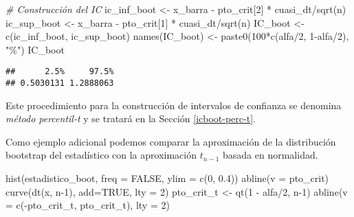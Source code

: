 \documentclass[
]{book}
\newenvironment{Shaded}{\begin{snugshade}}{\end{snugshade}}
\newcommand{\AttributeTok}[1]{\textcolor[rgb]{0.77,0.63,0.00}{#1}}
\newcommand{\CommentTok}[1]{\textcolor[rgb]{0.56,0.35,0.01}{\textit{#1}}}
\newcommand{\ConstantTok}[1]{\textcolor[rgb]{0.00,0.00,0.00}{#1}}
\newcommand{\DecValTok}[1]{\textcolor[rgb]{0.00,0.00,0.81}{#1}}
\newcommand{\FloatTok}[1]{\textcolor[rgb]{0.00,0.00,0.81}{#1}}
\newcommand{\FunctionTok}[1]{\textcolor[rgb]{0.00,0.00,0.00}{#1}}
\newcommand{\NormalTok}[1]{#1}
\newcommand{\OtherTok}[1]{\textcolor[rgb]{0.56,0.35,0.01}{#1}}
\newcommand{\SpecialCharTok}[1]{\textcolor[rgb]{0.00,0.00,0.00}{#1}}
\newcommand{\StringTok}[1]{\textcolor[rgb]{0.31,0.60,0.02}{#1}}
\theoremstyle{break}
\theoremstyle{definition}
\theoremstyle{definition}
\theoremstyle{definition}
\theoremstyle{definition}
\theoremstyle{remark}
\begin{document}
\begin{Shaded}
\begin{Highlighting}[]
\CommentTok{\# Construcción del IC}
\NormalTok{ic\_inf\_boot }\OtherTok{\textless{}{-}}\NormalTok{ x\_barra }\SpecialCharTok{{-}}\NormalTok{ pto\_crit[}\DecValTok{2}\NormalTok{] }\SpecialCharTok{*}\NormalTok{ cuasi\_dt}\SpecialCharTok{/}\FunctionTok{sqrt}\NormalTok{(n)}
\NormalTok{ic\_sup\_boot }\OtherTok{\textless{}{-}}\NormalTok{ x\_barra }\SpecialCharTok{{-}}\NormalTok{ pto\_crit[}\DecValTok{1}\NormalTok{] }\SpecialCharTok{*}\NormalTok{ cuasi\_dt}\SpecialCharTok{/}\FunctionTok{sqrt}\NormalTok{(n)}
\NormalTok{IC\_boot }\OtherTok{\textless{}{-}} \FunctionTok{c}\NormalTok{(ic\_inf\_boot, ic\_sup\_boot)}
\FunctionTok{names}\NormalTok{(IC\_boot) }\OtherTok{\textless{}{-}} \FunctionTok{paste0}\NormalTok{(}\DecValTok{100}\SpecialCharTok{*}\FunctionTok{c}\NormalTok{(alfa}\SpecialCharTok{/}\DecValTok{2}\NormalTok{, }\DecValTok{1}\SpecialCharTok{{-}}\NormalTok{alfa}\SpecialCharTok{/}\DecValTok{2}\NormalTok{), }\StringTok{"\%"}\NormalTok{)}
\NormalTok{IC\_boot}
\end{Highlighting}
\end{Shaded}

\begin{verbatim}
##      2.5%     97.5% 
## 0.5030131 1.2888063
\end{verbatim}

Este procedimiento para la construcción de intervalos de confianza
se denomina \emph{método percentil-t} y se tratará en la Sección \ref{icboot-perc-t}.

Como ejemplo adicional podemos comparar la aproximación de la distribución bootstrap del estadístico con la aproximación \(t_{n-1}\) basada en normalidad.

\begin{Shaded}
\begin{Highlighting}[]
\FunctionTok{hist}\NormalTok{(estadistico\_boot, }\AttributeTok{freq =} \ConstantTok{FALSE}\NormalTok{, }\AttributeTok{ylim =} \FunctionTok{c}\NormalTok{(}\DecValTok{0}\NormalTok{, }\FloatTok{0.4}\NormalTok{))}
\FunctionTok{abline}\NormalTok{(}\AttributeTok{v =}\NormalTok{ pto\_crit)}
\FunctionTok{curve}\NormalTok{(}\FunctionTok{dt}\NormalTok{(x, n}\DecValTok{{-}1}\NormalTok{), }\AttributeTok{add=}\ConstantTok{TRUE}\NormalTok{, }\AttributeTok{lty =} \DecValTok{2}\NormalTok{)}
\NormalTok{pto\_crit\_t }\OtherTok{\textless{}{-}} \FunctionTok{qt}\NormalTok{(}\DecValTok{1} \SpecialCharTok{{-}}\NormalTok{ alfa}\SpecialCharTok{/}\DecValTok{2}\NormalTok{, n}\DecValTok{{-}1}\NormalTok{)}
\FunctionTok{abline}\NormalTok{(}\AttributeTok{v =} \FunctionTok{c}\NormalTok{(}\SpecialCharTok{{-}}\NormalTok{pto\_crit\_t, pto\_crit\_t), }\AttributeTok{lty =} \DecValTok{2}\NormalTok{)}
\end{Highlighting}
\end{Shaded}
\end{document}
